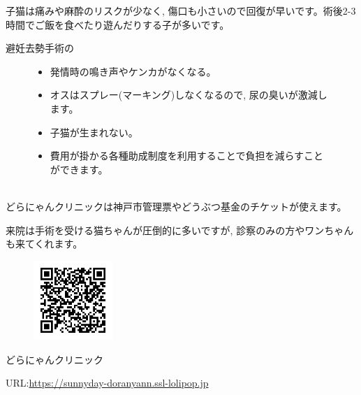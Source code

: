 \documentclass{jsarticle}
\begin{document}
\Large
  子猫は痛みや麻酔のリスクが少なく, 傷口も小さいので回復が早いです。術後2-3時間でご飯を食べたり遊んだりする子が多いです。

	避妊去勢手術の

	\begin{figure}[htbp]
		\Large
		\centering
		\begin{minipage}{0.4\columnwidth}
			\begin{itemize}
				\item 発情時の鳴き声やケンカがなくなる。
				\item オスはスプレー(マーキング)しなくなるので, 尿の臭いが激減します。
				\item 子猫が生まれない。
			\end{itemize}
		\end{minipage}
		\begin{minipage}{0.4\columnwidth}
			\begin{itemize}
				\item 費用が掛かる各種助成制度を利用することで負担を減らすことができます。\\\\
			\end{itemize}
		\end{minipage}
	\end{figure}

	どらにゃんクリニックは神戸市管理票やどうぶつ基金のチケットが使えます。

	来院は手術を受ける猫ちゃんが圧倒的に多いですが, 診察のみの方やワンちゃんも来てくれます。

	\vspace{30pt}
	\begin{figure}
		\vspace*{-\intextsep}
		\includegraphics[width=3cm]{URLdoranyan.png}
	\end{figure}
	どらにゃんクリニック

	URL:\url{https://sunnyday-doranyann.ssl-lolipop.jp}
\end{document}
